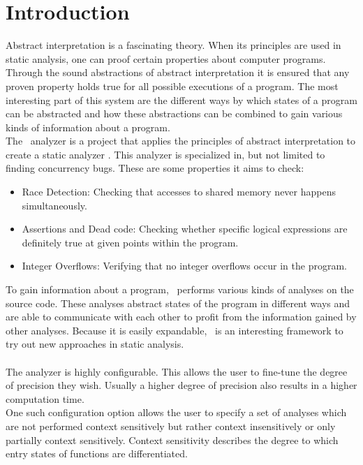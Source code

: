 
\chapter{Introduction}\label{chapter:introduction}
  Abstract interpretation is a fascinating theory. When its principles are used in static analysis, one can proof certain properties about computer programs. Through the sound abstractions of abstract interpretation it is ensured that any proven property holds true for all possible executions of a program. The most interesting part of this system are the different ways by which states of a program can be abstracted and how these abstractions can be combined to gain various kinds of information about a program.\\
  The \gob\ analyzer is a project that applies the principles of abstract interpretation to create a static analyzer \parencite{goblintHome}. This analyzer is specialized in, but not limited to finding concurrency bugs. These are some properties it aims to check:
  \begin{itemize}
    \item Race Detection: Checking that accesses to shared memory never happens simultaneously.
    \item Assertions and Dead code: Checking whether specific logical expressions are definitely true at given points within the program. 
    \item Integer Overflows: Verifying that no integer overflows occur in the program.
  \end{itemize}
  To gain information about a program, \gob\ performs various kinds of analyses on the source code. These analyses abstract states of the program in different ways and are able to communicate with each other to profit from the information gained by other analyses. Because it is easily expandable, \gob\ is an interesting framework to try out new approaches in static analysis.\\
  \\
  The analyzer is highly configurable. This allows the user to fine-tune the degree of precision they wish. Usually a higher degree of precision also results in a higher computation time.\\
  One such configuration option allows the user to specify a set of analyses which are not performed context sensitively but rather context insensitively or only partially context sensitively. Context sensitivity describes the degree to which entry states of functions are differentiated.\\
